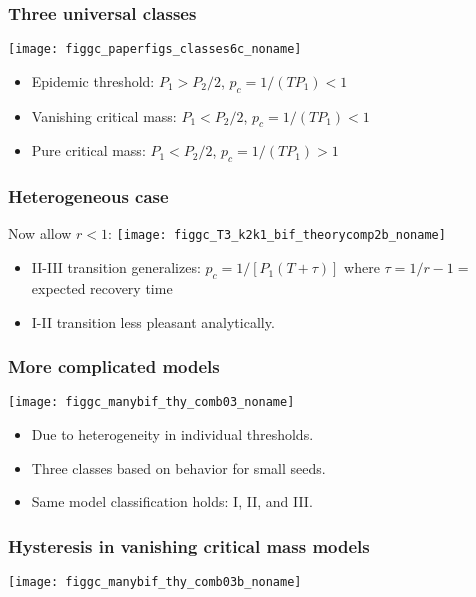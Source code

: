 \begin{frame}
  \frametitle{Three universal classes}

  \texttt{[image: figgc\_paperfigs\_classes6c\_noname]}

  \begin{itemize}
  \item<2-> 
    Epidemic threshold: \hfill \small{$P_1 > P_2/2$, $p_c = 1/(TP_1) < 1$}
  \item<3-> 
    Vanishing critical mass: \hfill \small{$P_1 < P_2/2$, $p_c = 1/(TP_1) < 1$}
  \item<4-> 
    Pure critical mass: \hfill \small{$P_1 < P_2/2$, $p_c = 1/(TP_1) > 1$}
  \end{itemize}

\end{frame}


\begin{frame}
  \frametitle{Heterogeneous case}

  \begin{block}{Now allow $r<1$:}
    \texttt{[image: figgc\_T3\_k2k1\_bif\_theorycomp2b\_noname]}
  \end{block}
  
  \begin{itemize}
  \item 
    II-III transition generalizes: $p_c = 1/[P_1 (T + \tau)]$
    where $ \tau = 1/r - 1 = $ expected recovery time
  \item 
    I-II transition less pleasant analytically.
  \end{itemize}
  
\end{frame}


\begin{frame}
  \frametitle{More complicated models}

  \texttt{[image: figgc\_manybif\_thy\_comb03\_noname]}

  \begin{itemize}
  \item 
    Due to heterogeneity in individual thresholds.
  \item
    Three classes based on behavior for small seeds.
  \item
    Same model classification holds:  I, II, and III.
  \end{itemize}

\end{frame}

\begin{frame}
  \frametitle{Hysteresis in vanishing critical mass models}

  \centering
  \texttt{[image: figgc\_manybif\_thy\_comb03b\_noname]}

\end{frame}

